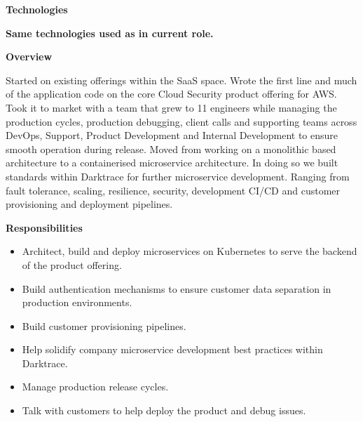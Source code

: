 \documentclass[10pt,a4paper]{altacv}
\begin{document}

\divider
\textbf{Technologies}

{\faExclamation}{   \textbf{Same technologies used as in current role.}}

\divider


\textbf{Overview}

Started on existing offerings within the SaaS space. Wrote the first line and much of the application code on the core Cloud Security product offering for AWS. Took it to market with a team that grew to 11 engineers while managing the production cycles, production debugging, client calls and supporting teams across DevOps, Support, Product Development and Internal Development to ensure smooth operation during release.
\newline
\newline
Moved from working on a monolithic based architecture to a containerised microservice architecture. In doing so we built standards within Darktrace for further microservice development. Ranging from fault tolerance, scaling, resilience, security, development CI/CD and customer provisioning and deployment pipelines.

\divider
\textbf{Responsibilities}

\begin{itemize}
\item Architect, build and deploy microservices on Kubernetes to serve the backend of the product offering.
\item Build authentication mechanisms to ensure customer data separation in production environments.
\item Build customer provisioning pipelines.
\item Help solidify company microservice development best practices within Darktrace.
\item Manage production release cycles.
\item Talk with customers to help deploy the product and debug issues.
\end{itemize}
\divider
  
\end{document}
